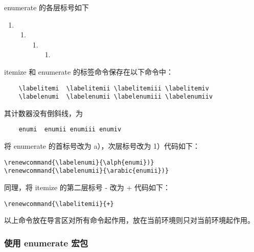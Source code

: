 enumerate 的各层标号如下

\begin{enumerate}
  \item
  \begin{enumerate}
    \item
    \begin{enumerate}
      \item
      \begin{enumerate}
        \item
      \end{enumerate}
    \end{enumerate}
  \end{enumerate}
\end{enumerate}

itemize 和 enumerate 的标签命令保存在以下命令中：

\begin{shaded}
  \begin{Verbatim}
    \labelitemi  \labelitemii \labelitemiii \labelitemiv
    \labelenumi  \labelenumii \labelenumiii \labelenumiiv
  \end{Verbatim}
\end{shaded}

其计数器没有倒斜线，为

\begin{framed}
  \begin{Verbatim}
    enumi  enumii enumiii enumiv
  \end{Verbatim}
\end{framed}

将 enumerate 的首标号改为 a），次层标号改为 1）代码如下：

\begin{shaded}
  \begin{Verbatim}
\renewcommand{\labelenumi}{\alph{enumi})}
\renewcommand{\labelenumii}{\arabic{enumii})}
  \end{Verbatim}
\end{shaded}


同理，将 itemize 的第二层标号 - 改为 + 代码如下：


\begin{shaded}
  \begin{Verbatim}
\renewcommand{\labelitemii}{+}
  \end{Verbatim}
\end{shaded}

以上命令放在导言区对所有命令起作用，放在当前环境则只对当前环境起作用。


\subsubsection{使用 enumerate 宏包}


